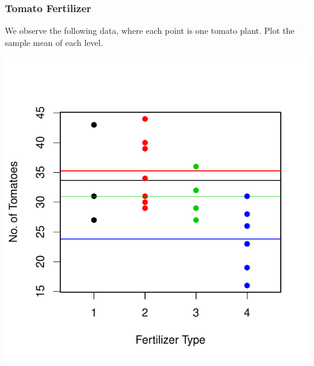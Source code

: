\documentclass[handout]{beamer}
\begin{document}
\addtocounter{framenumber}{-1}
\begin{frame}
\frametitle{Tomato Fertilizer}
We observe the following data, where each point is one tomato plant.  Plot the sample mean of each level. \textcolor{white}{Question:  are the mean tomato yields different?} 
\begin{center}
\includegraphics{figure/lec22-004}
\end{center}
\end{frame}
\end{document}
